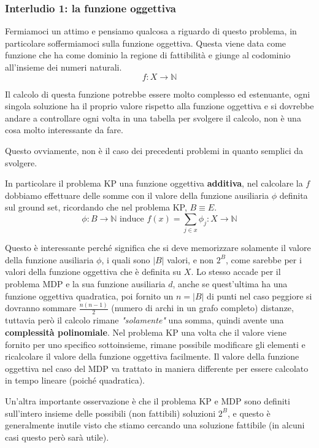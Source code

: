 \documentclass{article}
\begin{document}
\subsubsection{Interludio 1: la funzione oggettiva}
Fermiamoci un attimo e pensiamo qualcosa a riguardo di questo problema, in particolare soffermiamoci sulla funzione oggettiva.
Questa viene data come funzione che ha come dominio la regione di fattibilità e giunge al
codominio all'insieme dei numeri naturali.
$$f:X\rightarrow \mathbb{N}$$

Il calcolo di questa funzione potrebbe essere molto complesso ed estenuante, ogni singola soluzione ha il proprio valore rispetto alla funzione oggettiva
e si dovrebbe andare a controllare ogni volta in una tabella per svolgere il calcolo, non è una cosa molto interessante da fare.

Questo ovviamente, non è il caso dei precedenti problemi in quanto semplici da svolgere.

In particolare il problema KP una funzione oggettiva \textbf{additiva}, nel calcolare la $f$ dobbiamo effettuare delle somme
con il valore della funzione ausiliaria $\phi$ definita sul ground set, ricordando che nel problema KP, $B \equiv E$.
$$\phi : B\rightarrow \mathbb{N} \text{ induce } f(x)=\sum_{j\in x}\phi_j : X \rightarrow \mathbb{N}$$

Questo è interessante perché significa che si deve memorizzare solamente il valore della funzione
ausiliaria $\phi$, i quali sono $|B|$ valori, e non $2^B$, come sarebbe per i valori della funzione
oggettiva che è definita su $X$.
\newline
\newline
Lo stesso accade per il problema MDP e la sua funzione ausiliaria $d$, anche se quest'ultima ha una funzione oggettiva quadratica,
poi fornito un $n=|B|$ di punti nel caso peggiore si dovranno sommare $\frac{n(n-1)}{2}$ (numero di archi in un grafo completo) distanze, tuttavia però il
calcolo rimane \textit{"solamente"} una somma, quindi avente una \textbf{complessità polinomiale}.
\newline
Nel problema KP una volta che il valore viene fornito per uno specifico sottoinsieme, rimane possibile modificare gli elementi
e ricalcolare il valore della funzione oggettiva facilmente. Il valore della funzione oggettiva nel caso del MDP va trattato in maniera differente
per essere calcolato in tempo lineare (poiché quadratica).

Un'altra importante osservazione è che il problema KP e MDP sono definiti sull'intero insieme delle possibili (non fattibili)
soluzioni $2^B$, e questo è generalmente inutile visto che stiamo cercando
una soluzione fattibile (in alcuni casi questo però sarà utile).
\end{document}

